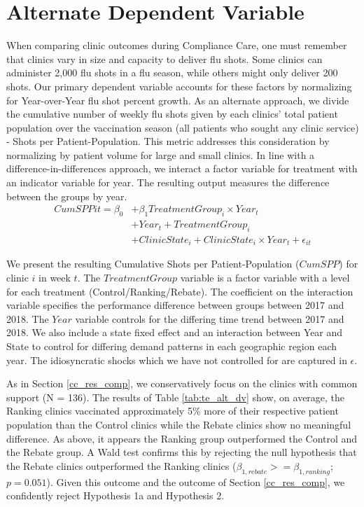\section{Alternate Dependent Variable} \label{app_cc_alt_dv}
When comparing clinic outcomes during Compliance Care, one must remember that clinics vary in size and capacity to deliver flu shots. Some clinics can administer 2,000 flu shots in a flu season, while others might only deliver 200 shots. Our primary dependent variable accounts for these factors by normalizing for Year-over-Year flu shot percent growth. As an alternate approach, we divide the cumulative number of weekly flu shots given by each clinics’ total patient population over the vaccination season (all patients who sought any clinic service) - Shots per Patient-Population. This metric addresses this consideration by normalizing by patient volume for large and small clinics. In line with a difference-in-differences approach, we interact a factor variable for treatment with an indicator variable for year. The resulting output measures the difference between the groups by year.  
  \begin{equation} \tag{4} \begin{split}
       CumSPP{it} = \beta_0 & + \beta_1 TreatmentGroup_i \times Year_t \\
       & + Year_t + TreatmentGroup_i \\ & + ClinicState_i + ClinicState_i \times Year_t + \epsilon_{it} 
  \end{split}  \end{equation}

We present the resulting Cumulative Shots per Patient-Population ($CumSPP$) for clinic $i$ in week $t$. The $TreatmentGroup$ variable is a factor variable with a level for each treatment (Control/Ranking/Rebate). The coefficient on the interaction variable specifies the performance difference between groups between 2017 and 2018. The $Year$ variable controls for the differing time trend between 2017 and 2018. We also include a state fixed effect and an interaction between Year and State to control for differing demand patterns in each geographic region each year. The idiosyncratic shocks which we have not controlled for are captured in $\epsilon$. 

As in Section \ref{cc_res_comp}, we conservatively focus on the clinics with common support (N = 136). The results of Table \ref{tab:te_alt_dv} show, on average, the Ranking clinics vaccinated approximately 5\% more of their respective patient population than the Control clinics while the Rebate clinics show no meaningful difference. As above, it appears the Ranking group outperformed the Control and the Rebate group. A Wald test confirms this by rejecting the null hypothesis that the Rebate clinics outperformed the Ranking clinics ($\beta_{1,rebate} >= \beta_{1,ranking}$; $p = 0.051$). Given this outcome and the outcome of Section \ref{cc_res_comp}, we confidently reject Hypothesis 1a and Hypothesis 2.

